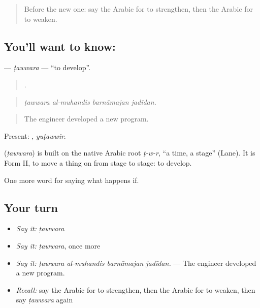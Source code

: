 \label{lesson:AR-C418-tawwara}



\begin{quote}
Before the new one: say the Arabic for to strengthen, then the Arabic for to weaken.
\end{quote}

\subsection*{You'll want to know: }
\textbf{} — \emph{ṭawwara} — \textquotedblleft{}to develop\textquotedblright{}.

\begin{quote}
   .
\end{quote}

\begin{quote}
\emph{ṭawwara al-muhandis barnāmajan jadīdan.}
\end{quote}

\begin{quote}
The engineer developed a new program.
\end{quote}

Present: , \emph{yuṭawwir}.

\begin{cousinweb}
\textbf{} (\emph{ṭawwara}) is built on the native Arabic root \emph{ṭ-w-r}, \textquotedblleft{}a time, a stage\textquotedblright{} (Lane). It is Form II, to move a thing on from stage to stage: to develop.
\end{cousinweb}

\begin{grammarlens}[title={What you've built}]
One more word for saying what happens if.
\end{grammarlens}

\subsection*{Your turn}
\begin{itemize}
\raggedright
  \item \emph{Say it:} \emph{ṭawwara}
  \item \emph{Say it:} \emph{ṭawwara}, once more
  \item \emph{Say it:} \emph{ṭawwara al-muhandis barnāmajan jadīdan.} — The engineer developed a new program.
  \item \emph{Recall:} say the Arabic for to strengthen, then the Arabic for to weaken, then say \emph{ṭawwara} again
\end{itemize}

